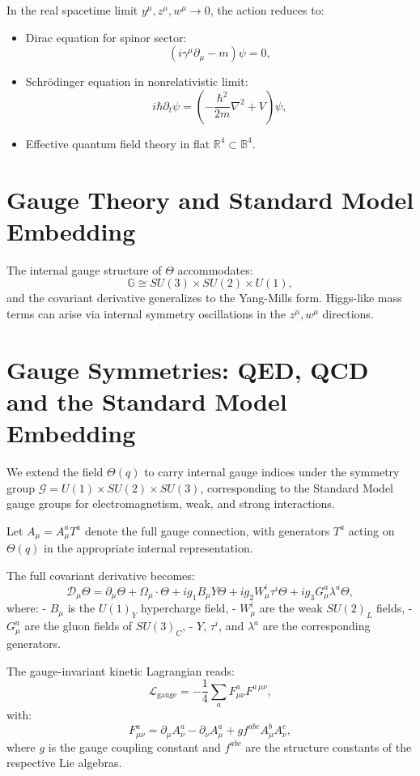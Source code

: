 \documentclass[12pt]{article}
\begin{document}
In the real spacetime limit \( y^\mu, z^\mu, w^\mu \to 0 \), the action reduces to:
\begin{itemize}
  \item Dirac equation for spinor sector:
  \[
  (i \gamma^\mu \partial_\mu - m) \psi = 0,
  \]
  \item Schrödinger equation in nonrelativistic limit:
  \[
  i \hbar \partial_t \psi = \left( -\frac{\hbar^2}{2m} \nabla^2 + V \right) \psi,
  \]
  \item Effective quantum field theory in flat \( \mathbb{R}^4 \subset \mathbb{B}^4 \).
\end{itemize}


\section{Gauge Theory and Standard Model Embedding}

The internal gauge structure of \( \Theta \) accommodates:
\[
\mathbb{G} \cong SU(3) \times SU(2) \times U(1),
\]
and the covariant derivative generalizes to the Yang-Mills form. Higgs-like mass terms can arise via internal symmetry oscillations in the \( z^\mu, w^\mu \) directions.

\section{Gauge Symmetries: QED, QCD and the Standard Model Embedding}

We extend the field \(\Theta(q)\) to carry internal gauge indices under the symmetry group \( \mathcal{G} = U(1) \times SU(2) \times SU(3) \), corresponding to the Standard Model gauge groups for electromagnetism, weak, and strong interactions.

Let \(A_\mu = A_\mu^a T^a\) denote the full gauge connection, with generators \(T^a\) acting on \(\Theta(q)\) in the appropriate internal representation.

The full covariant derivative becomes:
\[
\mathcal{D}_\mu \Theta = \partial_\mu \Theta + \Omega_\mu \cdot \Theta + i g_1 B_\mu Y \Theta + i g_2 W_\mu^i \tau^i \Theta + i g_3 G_\mu^a \lambda^a \Theta,
\]
where:
- \(B_\mu\) is the \(U(1)_Y\) hypercharge field,
- \(W_\mu^i\) are the weak \(SU(2)_L\) fields,
- \(G_\mu^a\) are the gluon fields of \(SU(3)_C\),
- \(Y\), \(\tau^i\), and \(\lambda^a\) are the corresponding generators.

The gauge-invariant kinetic Lagrangian reads:
\[
\mathcal{L}_{\text{gauge}} = -\frac{1}{4} \sum_a F^{a}_{\mu\nu} F^{a\,\mu\nu},
\]
with:
\[
F^a_{\mu\nu} = \partial_\mu A^a_\nu - \partial_\nu A^a_\mu + g f^{abc} A^b_\mu A^c_\nu,
\]
where \(g\) is the gauge coupling constant and \(f^{abc}\) are the structure constants of the respective Lie algebras.
\end{document}

